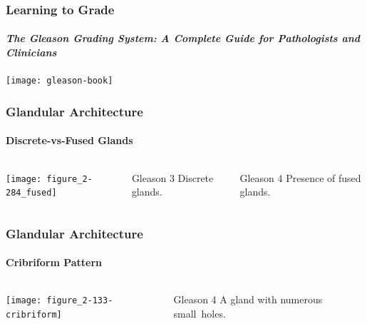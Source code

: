 \begin{frame}
    \frametitle{Learning to Grade}
    \framesubtitle{\emph{The Gleason Grading System: A Complete Guide for
    Pathologists and Clinicians}}

    \centering
    \texttt{[image: gleason-book]}

\end{frame}


\begin{frame}
\frametitle{Glandular Architecture}
    \framesubtitle{Discrete-vs-Fused Glands}

    \begin{columns}
        \centering
        \texttt{[image: figure\_2-284\_fused]}
        \begin{block}{Gleason 3}
            Discrete glands. 
        \end{block}
        \begin{block}{Gleason 4}
            Presence of fused glands. 
        \end{block}
    \end{columns}
    
\end{frame}

\begin{frame}
\frametitle{Glandular Architecture}
    \framesubtitle{Cribriform Pattern}

    \begin{columns}
        \centering
        \texttt{[image: figure\_2-133-cribriform]}
        \begin{block}{Gleason 4}
            {A gland with numerous small~holes.}
        \end{block}
    \end{columns}

\end{frame}

